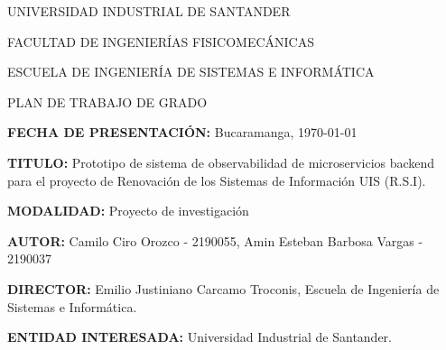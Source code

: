 \documentclass[a4paper,12pt]{article}
\begin{document}
\begin{titlepage}
    \begin{center}
        {\fontsize{14}{14}\selectfont UNIVERSIDAD INDUSTRIAL DE SANTANDER \par}
        \vspace{10pt}
        {\fontsize{14}{14}\selectfont FACULTAD DE INGENIERÍAS FISICOMECÁNICAS \par}
        \vspace{10pt}
        {\fontsize{14}{14}\selectfont ESCUELA DE INGENIERÍA DE SISTEMAS E INFORMÁTICA \par}
        \vspace{10pt}
        \vspace{10pt}
        \vspace{10pt}
        \vspace{10pt}
        \vspace{10pt}
        {\fontsize{14}{14}\selectfont PLAN DE TRABAJO DE GRADO \par}
        \vspace{10pt}
        \vspace{10pt}
        \vspace{10pt}
        \vspace{10pt}
    \end{center}
    {\normalsize \textbf{FECHA DE PRESENTACIÓN:} Bucaramanga, \today \par}
    \vspace{1cm}
    {\normalsize \textbf{TITULO:} Prototipo de sistema de observabilidad de microservicios backend para el proyecto de Renovación de los Sistemas de Información UIS (R.S.I). \par}
    \vspace{1cm}
    {\normalsize \textbf{MODALIDAD:} Proyecto de investigación \par}
    \vspace{1cm}
    {\normalsize \textbf{AUTOR:} Camilo Ciro Orozco - 2190055, Amin Esteban Barbosa Vargas - 2190037 \par}
    \vspace{1cm}
    {\normalsize \textbf{DIRECTOR:} Emilio Justiniano Carcamo Troconis, Escuela de Ingeniería de Sistemas e Informática. \par}
    \vspace{1cm}
    {\normalsize \textbf{ENTIDAD INTERESADA:} Universidad Industrial de Santander. \par}
\end{titlepage}
\end{document}
